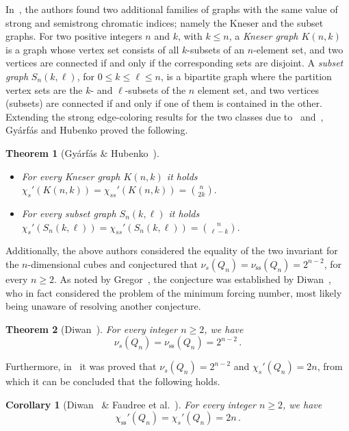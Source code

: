 \documentclass[12pt,a4paper]{article}
\newtheorem{theorem}{Theorem}
\newtheorem{corollary}{Corollary}
\newcommand{\chis}[1]{\ensuremath{\chi_{s}'(#1)}}
\newcommand{\chiss}[1]{\ensuremath{\chi_{\mathrm{ss}}'(#1)}}
\begin{document}
In~\cite{GyaHub05}, the authors found two additional families of graphs with
the same value of strong and semistrong chromatic indices;
namely the Kneser and the subset graphs.
For two positive integers $n$ and $k$, with $k \le n$, a {\em Kneser graph $K(n,k)$} is a graph 
whose vertex set consists of all $k$-subsets of an $n$-element set, 
and two vertices are connected if and only if the corresponding sets are disjoint.
A {\em subset graph} $S_n(k,\ell)$, 
for $0 \le k \le \ell \le n$, 
is a bipartite graph where the partition vertex sets are the $k$- and $\ell$-subsets of the $n$ element set, 
and two vertices (subsets) are connected if and only if one of them is contained in the other. 
Extending the strong edge-coloring results for the two classes due to~\cite{FauGyaSchTuz90} and~\cite{QuiBen97},
Gy\'{a}rf\'{a}s and Hubenko proved the following.
\begin{theorem}[Gy\'{a}rf\'{a}s \& Hubenko~\cite{GyaHub05}]~
	\begin{itemize}
	\item[$(A)$]
			For every Kneser graph $K(n,k)$ it holds 
			$\chi_{s}'(K(n,k)) =\chi_{ss}'(K(n,k)) = {n \choose 2k}.$
	\item[$(B)$]
			For every subset graph $S_n(k,\ell)$ it holds 
			$\chi_{s}'(S_n(k,\ell)) = \chi_{ss}'(S_n(k,\ell)) = {n \choose \ell-k}.$		
	\end{itemize}
\end{theorem}

Additionally, the above authors considered the equality of the two invariant for the $n$-dimensional cubes
and conjectured that $\nu_{s}(Q_n) = \nu_{\mathrm{ss}}(Q_n) = 2^{n-2}$, for every $n \ge 2$.
As noted by Gregor~\cite{Gre20}, the conjecture was established by Diwan~\cite{Diw19}, who in fact considered the problem of the minimum forcing number,
most likely being unaware of resolving another conjecture.
\begin{theorem}[Diwan~\cite{Diw19}]
	\label{conj:hyper}
	For every integer $n \ge 2$, we have
	$$
		\nu_{s}(Q_n) = \nu_{\mathrm{ss}}(Q_n) = 2^{n-2}\,.
	$$
\end{theorem}
Furthermore, in~\cite{FauGyaSchTuz90} it was proved that $\nu_{s}(Q_n)=2^{n-2}$ and $\chis{Q_n}=2n$,
from which it can be concluded that the following holds.
\begin{corollary}[Diwan~\cite{Diw19} \& Faudree et al.~\cite{FauGyaSchTuz90}]
	For every integer $n \ge 2$, we have
	$$
		\chiss{Q_n} = \chis{Q_n} = 2n\,.
	$$
\end{corollary}
\end{document}
